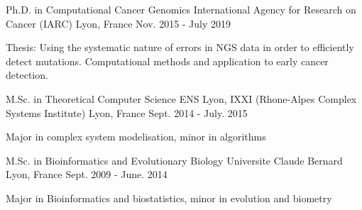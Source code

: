 

\begin{cventries}

      \cventry
    {Ph.D. in Computational Cancer Genomics} %
    {International Agency for Research on Cancer (IARC)} %
    {Lyon, France} %
    {Nov. 2015 - July 2019} %
    {
      \begin{cvitems} %
        \item {Thesis: Using the systematic nature of errors in NGS data in order to efficiently detect mutations. Computational methods and application to early cancer detection.}
      \end{cvitems}
    }
    
      \cventry
    {M.Sc. in Theoretical Computer Science} %
    {ENS Lyon, IXXI (Rhone-Alpes Complex Systems Institute) } %
    {Lyon, France} %
    {Sept. 2014 - July. 2015} %
    {
      \begin{cvitems} %
        \item {Major in complex system modelisation, minor in algorithms}
      \end{cvitems}
    }
    
    \cventry
    {M.Sc. in Bioinformatics and Evolutionary Biology} %
    {Universite Claude Bernard } %
    {Lyon, France} %
    {Sept. 2009 - June. 2014} %
    {
      \begin{cvitems} %
        \item {Major in Bioinformatics and biostatistics, minor in evolution and biometry}
      \end{cvitems}
    }

\end{cventries}
